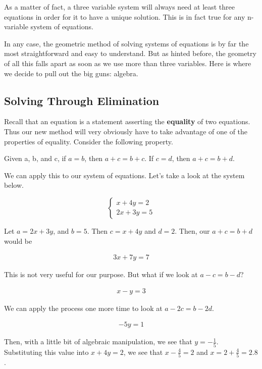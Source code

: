 \documentclass{scrbook}
\theoremstyle{definition}
\begin{document}
As a matter of fact, a three variable system will always need at least three equations in order for it to have a unique solution. This is in fact true for any n-variable system of equations.  

In any case, the geometric method of solving systems of equations is by far the most straightforward and easy to understand. But as hinted before, the geometry of all this falls apart as soon as we use more than three variables. Here is where we decide to pull out the big guns: algebra. 

\subsection{Solving Through Elimination}

Recall that an equation is a statement asserting the \textbf{equality} of two equations. Thus our new method will very obviously have to take advantage of one of the properties of equality. Consider the following property. 

\begin{center}
  Given a, b, and c, if $a = b$, then $a + c = b + c$. If $c = d$, then $a + c = b + d$. 
\end{center}

We can apply this to our system of equations. Let's take a look at the system below. 

\[
  \begin{cases}
    x + 4y = 2\\
    2x + 3y = 5
  \end{cases}
\]

Let $a = 2x + 3y$, and $b = 5$. Then $c = x + 4y$ and $d = 2$. Then, our $a + c = b + d$ would be 

\begin{align*}
  3x + 7y = 7
\end{align*}

This is not very useful for our purpose. But what if we look at $a - c = b - d$?

\begin{align*}
  x - y = 3
\end{align*}

We can apply the process one more time to look at $a - 2c = b - 2d$. 

\begin{align*}
  - 5y = 1
\end{align*}

Then, with a little bit of algebraic manipulation, we see that $y = -\frac{1}{5}$. Substituting this value into $x + 4y = 2$, we see that $x - \frac{4}{5} = 2$ and $x = 2 + \frac{4}{5} = 2.8$. 
\end{document}
